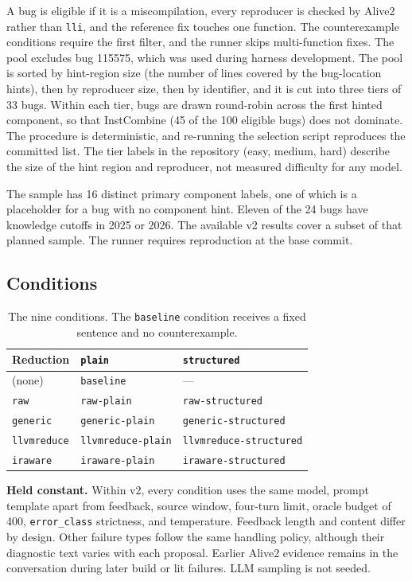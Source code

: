 \documentclass[conference]{IEEEtran}
\newcommand{\cn}[1]{\texttt{#1}}   %
\begin{document}
A bug is eligible if it is a miscompilation, every reproducer is checked by Alive2 rather than \texttt{lli}, and the reference fix touches one function. The counterexample conditions require the first filter, and the runner skips multi-function fixes. The pool excludes bug 115575, which was used during harness development. The pool is sorted by hint-region size (the number of lines covered by the bug-location hints), then by reproducer size, then by identifier, and it is cut into three tiers of 33 bugs. Within each tier, bugs are drawn round-robin across the first hinted component, so that InstCombine (45 of the 100 eligible bugs) does not dominate. The procedure is deterministic, and re-running the selection script reproduces the committed list. The tier labels in the repository (easy, medium, hard) describe the size of the hint region and reproducer, not measured difficulty for any model.

The sample has 16 distinct primary component labels, one of which is a placeholder for a bug with no component hint. Eleven of the 24 bugs have knowledge cutoffs in 2025 or 2026. The available v2 results cover a subset of that planned sample. The runner requires reproduction at the base commit.

\subsection{Conditions}

\begin{table}[t]
\caption{The nine conditions. The \cn{baseline} condition receives a fixed sentence and no counterexample.}
\label{tab:conditions}
\centering\footnotesize
\begin{tabular}{@{}lll@{}}
\toprule
Reduction & \cn{plain} & \cn{structured} \\
\midrule
(none) & \cn{baseline} & --- \\
\cn{raw} & \cn{raw-plain} & \cn{raw-structured} \\
\cn{generic} & \cn{generic-plain} & \cn{generic-structured} \\
\cn{llvmreduce} & \cn{llvmreduce-plain} & \cn{llvmreduce-structured} \\
\cn{iraware} & \cn{iraware-plain} & \cn{iraware-structured} \\
\bottomrule
\end{tabular}
\end{table}

\textbf{Held constant.} Within v2, every condition uses the same model, prompt template apart from feedback, source window, four-turn limit, oracle budget of 400, \cn{error\_class} strictness, and temperature. Feedback length and content differ by design. Other failure types follow the same handling policy, although their diagnostic text varies with each proposal. Earlier Alive2 evidence remains in the conversation during later build or lit failures. LLM sampling is not seeded.
\end{document}
